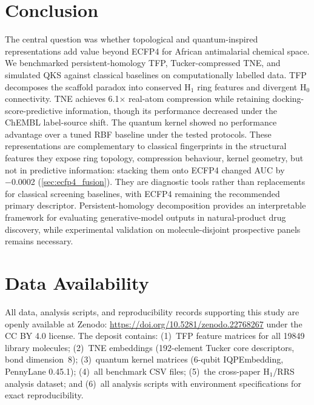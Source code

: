 \documentclass[11pt,a4paper]{article}
\begin{document}

\section{Conclusion}\label{sec:conclusion}

The central question was whether topological and quantum-inspired representations add value beyond ECFP4 for African antimalarial chemical space. We benchmarked persistent-homology TFP, Tucker-compressed TNE, and simulated QKS against classical baselines on computationally labelled data. TFP decomposes the scaffold paradox into conserved H$_1$ ring features and divergent H$_0$ connectivity. TNE achieves \num{6.1}$\times$ real-atom compression while retaining docking-score-predictive information, though its performance decreased under the ChEMBL label-source shift. The quantum kernel showed no performance advantage over a tuned RBF baseline under the tested protocols. These representations are complementary to classical fingerprints in the structural features they expose ring topology, compression behaviour, kernel geometry, but not in predictive information: stacking them onto ECFP4 changed AUC by \num{-0.0002} (\cref{sec:ecfp4_fusion}). They are diagnostic tools rather than replacements for classical screening baselines, with ECFP4 remaining the recommended primary descriptor. Persistent-homology decomposition provides an interpretable framework for evaluating generative-model outputs in natural-product drug discovery, while experimental validation on molecule-disjoint prospective panels remains necessary.


\section*{Data Availability}

All data, analysis scripts, and reproducibility records supporting this study are openly available at Zenodo: \url{https://doi.org/10.5281/zenodo.22768267} under the CC BY 4.0 license. The deposit contains: (1)~TFP feature matrices for all \num{19849} library molecules; (2)~TNE embeddings (\num{192}-element Tucker core descriptors, bond dimension~8); (3)~quantum kernel matrices (6-qubit IQPEmbedding, PennyLane 0.45.1); (4)~all benchmark CSV files; (5)~the cross-paper H$_1$/RRS analysis dataset; and (6)~all analysis scripts with environment specifications for exact reproducibility.
\end{document}
